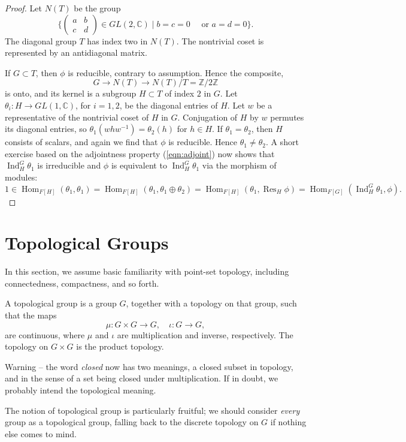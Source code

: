 \documentclass{amsart}
\def\op#1{{\operatorname{#1}}}
\newcommand{\ring}[1]{\mathbb{#1}}
\begin{document}
\begin{proof}
Let $N(T)$ be the group 
\[
\{\begin{pmatrix} a & b \\ c & d\end{pmatrix} \in GL(2,\ring{C}) \mid
b = c =0 \quad \text{ or } a = d = 0\}.
\]
The diagonal group $T$ has index two in $N(T)$.
The nontrivial coset is represented by an  antidiagonal matrix.

If $G\subset T$, then $\phi$ is reducible,
contrary to assumption.  Hence the composite,
\[
G\to N(T)\to N(T)/T = \ring{Z}/2\ring{Z}
\]
is onto, and its kernel is a subgroup $H\subset T$ of index $2$ in $G$.
Let
$\theta_i:H\to GL(1,\ring{C})$, for $i=1,2$, be the diagonal entries
of $H$.  Let $w$ be a representative of the nontrivial coset of $H$ in
$G$.  Conjugation of $H$ by $w$ permutes its diagonal entries, so
$\theta_1(w h w^{-1}) = \theta_2(h)$ for $h\in H$.  If
$\theta_1=\theta_2$, then $H$ consists of scalars, and again we find
that $\phi$ is reducible.  Hence $\theta_1\ne\theta_2$.  A short
exercise based on the adjointness property (\ref{eqn:adjoint}) now
shows that $\op{Ind}_H^G\theta_1$ is irreducible and $\phi$ is
equivalent to $\op{Ind}_H^G\theta_1$ via the morphism of modules:
\[
1\in\op{Hom}_{F[H]}(\theta_1,\theta_1)=\op{Hom}_{F[H]}(\theta_1,\theta_1\oplus\theta_2)=
\op{Hom}_{F[H]}(\theta_1,\op{Res}_H\phi) = \op{Hom}_{F[G]}(\op{Ind}_H^G\theta_1,\phi).
\]
\end{proof}

\newpage
\section{Topological Groups}

In this section, we assume basic familiarity with point-set topology,
including connectedness, compactness, and so forth. 

A topological group is a group $G$, together with a topology on that
group, such that the maps
\[
\mu:G\times G\to G,\quad \iota:G\to G,
\]
are continuous, where $\mu$ and $\iota$ are multiplication and
inverse, respectively.  The topology on $G\times G$ is the product
topology.

Warning -- the word {\it closed} now has two meanings, a closed subset
in topology, and in the sense of a set being closed under
multiplication.  If in doubt, we probably intend the topological
meaning.

The notion of topological group is particularly fruitful; we should
consider {\it every} group as a topological group, falling back to the
discrete topology on $G$ if nothing else comes to mind.
\end{document}

